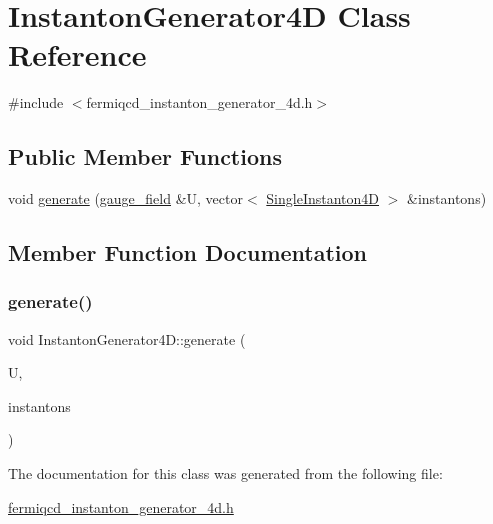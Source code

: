 \hypertarget{class_instanton_generator4_d}{}\section{Instanton\+Generator4D Class Reference}
\label{class_instanton_generator4_d}


{\ttfamily \#include $<$fermiqcd\+\_\+instanton\+\_\+generator\+\_\+4d.\+h$>$}

\subsection*{Public Member Functions}
\begin{DoxyCompactItemize}
\item 
void \hyperlink{class_instanton_generator4_d_a0f21f6b34c9d695f98ec844b856d51c0}{generate} (\hyperlink{classgauge__field}{gauge\+\_\+field} \&U, vector$<$ \hyperlink{class_single_instanton4_d}{Single\+Instanton4D} $>$ \&instantons)
\end{DoxyCompactItemize}


\subsection{Member Function Documentation}
\mbox{\label{class_instanton_generator4_d_a0f21f6b34c9d695f98ec844b856d51c0}} 
\subsubsection{\texorpdfstring{generate()}{generate()}}
{\footnotesize\ttfamily void Instanton\+Generator4\+D\+::generate (\begin{DoxyParamCaption}\item[{\hyperlink{classgauge__field}{gauge\+\_\+field} \&}]{U,  }\item[{vector$<$ \hyperlink{class_single_instanton4_d}{Single\+Instanton4D} $>$ \&}]{instantons }\end{DoxyParamCaption})\hspace{0.3cm}{\ttfamily [inline]}}



The documentation for this class was generated from the following file\+:\begin{DoxyCompactItemize}
\item 
\hyperlink{fermiqcd__instanton__generator__4d_8h}{fermiqcd\+\_\+instanton\+\_\+generator\+\_\+4d.\+h}\end{DoxyCompactItemize}
